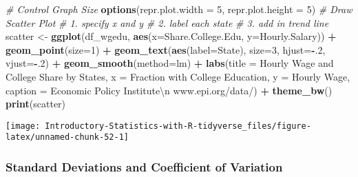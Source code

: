 \documentclass[
]{book}
\newenvironment{Shaded}{\begin{snugshade}}{\end{snugshade}}
\newcommand{\CharTok}[1]{\textcolor[rgb]{0.31,0.60,0.02}{#1}}
\newcommand{\CommentTok}[1]{\textcolor[rgb]{0.56,0.35,0.01}{\textit{#1}}}
\newcommand{\DataTypeTok}[1]{\textcolor[rgb]{0.13,0.29,0.53}{#1}}
\newcommand{\DecValTok}[1]{\textcolor[rgb]{0.00,0.00,0.81}{#1}}
\newcommand{\KeywordTok}[1]{\textcolor[rgb]{0.13,0.29,0.53}{\textbf{#1}}}
\newcommand{\NormalTok}[1]{#1}
\newcommand{\OperatorTok}[1]{\textcolor[rgb]{0.81,0.36,0.00}{\textbf{#1}}}
\newcommand{\StringTok}[1]{\textcolor[rgb]{0.31,0.60,0.02}{#1}}
\begin{document}
\begin{Shaded}
\begin{Highlighting}[]
\CommentTok{\# Control Graph Size}
\KeywordTok{options}\NormalTok{(}\DataTypeTok{repr.plot.width =} \DecValTok{5}\NormalTok{, }\DataTypeTok{repr.plot.height =} \DecValTok{5}\NormalTok{)}
\CommentTok{\# Draw Scatter Plot}
\CommentTok{\# 1. specify x and y}
\CommentTok{\# 2. label each state}
\CommentTok{\# 3. add in trend line}
\NormalTok{scatter \textless{}{-}}\StringTok{ }\KeywordTok{ggplot}\NormalTok{(df\_wgedu, }\KeywordTok{aes}\NormalTok{(}\DataTypeTok{x=}\NormalTok{Share.College.Edu, }\DataTypeTok{y=}\NormalTok{Hourly.Salary)) }\OperatorTok{+}
\StringTok{      }\KeywordTok{geom\_point}\NormalTok{(}\DataTypeTok{size=}\DecValTok{1}\NormalTok{) }\OperatorTok{+}
\StringTok{      }\KeywordTok{geom\_text}\NormalTok{(}\KeywordTok{aes}\NormalTok{(}\DataTypeTok{label=}\NormalTok{State), }\DataTypeTok{size=}\DecValTok{3}\NormalTok{, }\DataTypeTok{hjust=}\OperatorTok{{-}}\NormalTok{.}\DecValTok{2}\NormalTok{, }\DataTypeTok{vjust=}\OperatorTok{{-}}\NormalTok{.}\DecValTok{2}\NormalTok{) }\OperatorTok{+}
\StringTok{      }\KeywordTok{geom\_smooth}\NormalTok{(}\DataTypeTok{method=}\NormalTok{lm) }\OperatorTok{+}
\StringTok{      }\KeywordTok{labs}\NormalTok{(}\DataTypeTok{title =} \StringTok{\textquotesingle{}Hourly Wage and College Share by States\textquotesingle{}}\NormalTok{,}
           \DataTypeTok{x =} \StringTok{\textquotesingle{}Fraction with College Education\textquotesingle{}}\NormalTok{,}
           \DataTypeTok{y =} \StringTok{\textquotesingle{}Hourly Wage\textquotesingle{}}\NormalTok{,}
           \DataTypeTok{caption =} \StringTok{\textquotesingle{}Economic Policy Institute}\CharTok{\textbackslash{}n}\StringTok{ www.epi.org/data/\textquotesingle{}}\NormalTok{) }\OperatorTok{+}
\StringTok{      }\KeywordTok{theme\_bw}\NormalTok{()}
\KeywordTok{print}\NormalTok{(scatter)}
\end{Highlighting}
\end{Shaded}

\begin{center}\texttt{[image: Introductory-Statistics-with-R-tidyverse\_files/figure-latex/unnamed-chunk-52-1]} \end{center}

\hypertarget{standard-deviations-and-coefficient-of-variation}{%
\subsubsection{Standard Deviations and Coefficient of Variation}\label{standard-deviations-and-coefficient-of-variation}}
\end{document}
